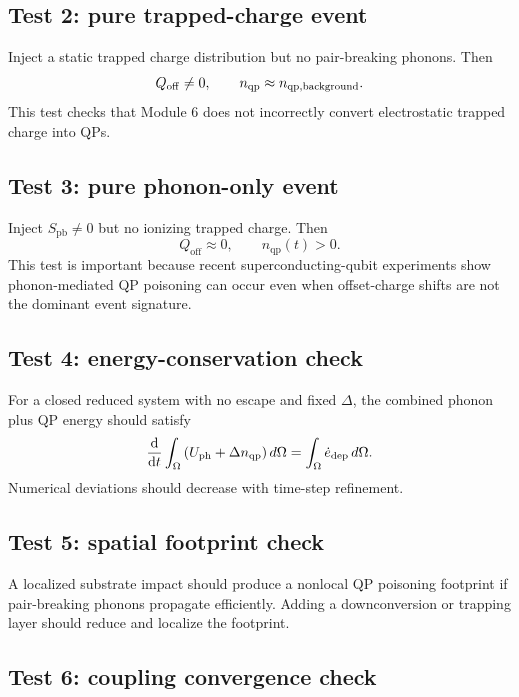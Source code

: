 \documentclass[11pt]{article}
\newcommand{\edot}{\dot{e}_{\mathrm{dep}}}
\newcommand{\Qoff}{Q_{\mathrm{off}}}
\newcommand{\DeltaSC}{\Delta}
\newcommand{\nqp}{n_{\mathrm{qp}}}
\begin{document}
\subsection{Test 2: pure trapped-charge event}

Inject a static trapped charge distribution but no pair-breaking phonons. Then
\begin{equation}
\Qoff\ne 0,
\qquad
\nqp\approx n_{\qp,\mathrm{background}}.
\end{equation}
This test checks that Module 6 does not incorrectly convert electrostatic trapped charge into QPs.

\subsection{Test 3: pure phonon-only event}

Inject \(S_{\mathrm{pb}}\ne0\) but no ionizing trapped charge. Then
\begin{equation}
\Qoff\approx0,
\qquad
\nqp(t)>0.
\end{equation}
This test is important because recent superconducting-qubit experiments show phonon-mediated QP poisoning can occur even when offset-charge shifts are not the dominant event signature.

\subsection{Test 4: energy-conservation check}

For a closed reduced system with no escape and fixed \(\DeltaSC\), the combined phonon plus QP energy should satisfy
\begin{equation}
\dv{}{t}\int_{\Omega}\left(U_{\mathrm{ph}}+\DeltaSC\nqp\right)d\Omega
=\int_{\Omega}\edot\,d\Omega.
\end{equation}
Numerical deviations should decrease with time-step refinement.

\subsection{Test 5: spatial footprint check}

A localized substrate impact should produce a nonlocal QP poisoning footprint if pair-breaking phonons propagate efficiently. Adding a downconversion or trapping layer should reduce and localize the footprint.

\subsection{Test 6: coupling convergence check}
\end{document}
